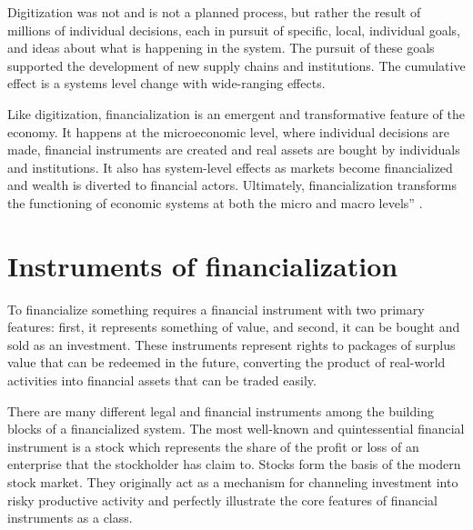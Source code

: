 Digitization was not and is not a planned process, but rather the result of millions of individual decisions, each in pursuit of specific, local, individual goals, and ideas about what is happening in the system. The pursuit of these goals supported the development of  new supply chains and institutions. %
The cumulative effect is a systems level change with wide-ranging effects.  

Like digitization, financialization is an emergent and transformative feature of the economy. It happens at the microeconomic level, where individual decisions are made, financial instruments are created and real assets are bought by individuals and institutions. It also has system-level effects as markets become financialized and wealth is diverted to financial actors. Ultimately, financialization transforms the functioning of economic systems at both the  micro and macro levels'' \cite{palleyFinancializationWhatIt2007}.  


\section{Instruments of financialization }

To financialize something requires a \gls{financial instrument} with two primary features: first, it represents something of value, and second, it can be bought and sold as an investment. These instruments represent rights to packages of surplus value that can be redeemed in the future, converting the product of real-world activities into financial assets that can be traded easily.   %

There are many different legal and financial instruments among the building blocks of a financialized system. The most well-known and quintessential financial instrument is a stock which represents the share of the profit or loss of an enterprise that the stockholder has claim to. Stocks form the basis of the modern stock market. %
They originally act as a mechanism for channeling investment into risky productive activity and perfectly illustrate the core features of financial instruments as a class. %


